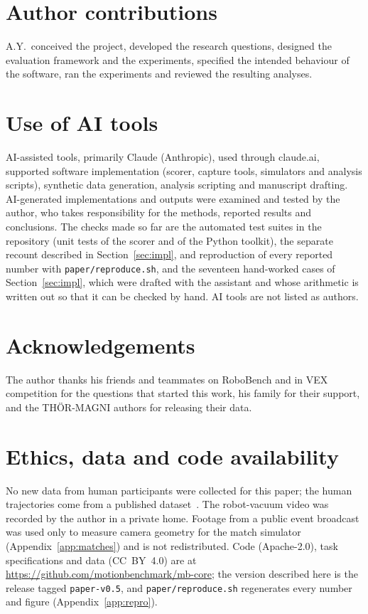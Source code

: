 \documentclass[11pt]{article}
\newcommand{\release}{\texttt{paper-v0.5}}
\begin{document}
\section*{Author contributions}
A.Y.\ conceived the project, developed the research questions, designed the evaluation framework and
the experiments, specified the intended behaviour of the software, ran the experiments and reviewed the
resulting analyses.

\section*{Use of AI tools}
AI-assisted tools, primarily Claude (Anthropic), used through claude.ai, supported software
implementation (scorer, capture tools, simulators and analysis scripts), synthetic data generation,
analysis scripting and manuscript drafting. AI-generated implementations and outputs were examined and
tested by the author, who takes responsibility for the methods, reported results and conclusions. The
checks made so far are the automated test suites in the repository (unit tests of the scorer and of
the Python toolkit), the separate recount described in Section~\ref{sec:impl}, and reproduction of every
reported number with \texttt{paper/reproduce.sh}, and the seventeen hand-worked cases of
Section~\ref{sec:impl}, which were drafted with the assistant and whose arithmetic is written out so
that it can be checked by hand.
AI tools are not listed as authors.

\section*{Acknowledgements}
The author thanks his friends and teammates on RoboBench and in VEX competition for the questions
that started this work, his family for their support, and the THÖR-MAGNI authors for releasing their
data.

\section*{Ethics, data and code availability}
No new data from human participants were collected for this paper; the human trajectories come from a
published dataset~\cite{thormagni2024}. The robot-vacuum video was recorded by the author in a private
home. Footage from a public event broadcast was used only to measure camera geometry for the match
simulator (Appendix~\ref{app:matches}) and is not redistributed. Code (Apache-2.0), task
specifications and data (CC~BY~4.0) are at \url{https://github.com/motionbenchmark/mb-core}; the
version described here is the release tagged \release{}, and \texttt{paper/reproduce.sh} regenerates
every number and figure (Appendix~\ref{app:repro}).
\end{document}

